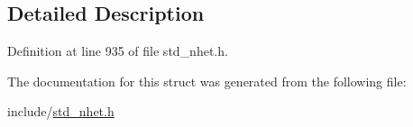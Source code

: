 \subsection{Detailed Description}


Definition at line 935 of file std\+\_\+nhet.\+h.



The documentation for this struct was generated from the following file\+:\begin{DoxyCompactItemize}
\item 
include/\mbox{\hyperlink{std__nhet_8h}{std\+\_\+nhet.\+h}}\end{DoxyCompactItemize}
